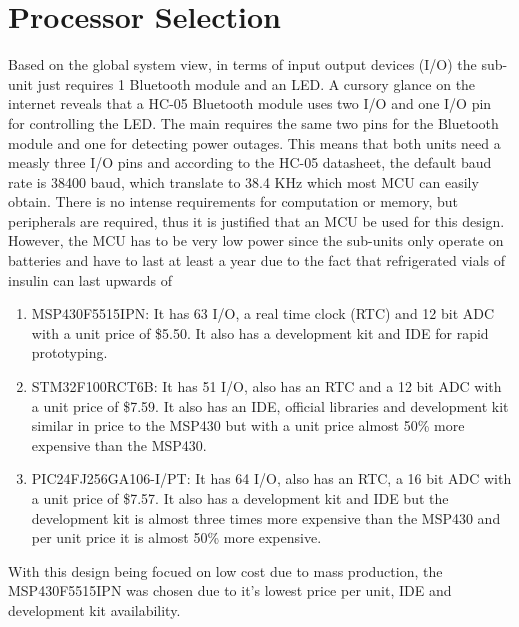 \section{Processor Selection}
Based on the global system view, in terms of input output devices (I/O) the sub-unit just requires 1 Bluetooth module and an LED. A cursory glance on the internet reveals that a HC-05 Bluetooth module\cite{InterfacingHC05Bluetooth} uses two I/O and one I/O pin for controlling the LED. The main requires the same two pins for the Bluetooth module and one for detecting power outages. This means that both units need a measly three I/O pins and according to the HC-05 datasheet, the default baud rate is 38400 baud, which translate to 38.4 KHz which most MCU can easily obtain. There is no intense requirements for computation or memory, but peripherals are required, thus it is justified that an MCU be used for this design. However, the MCU has to be very low power since the sub-units only operate on batteries and have to last at least a year due to the fact that refrigerated vials of insulin can last upwards of
\begin{enumerate}
  \item MSP430F5515IPN: It has 63 I/O, a real time clock (RTC) and 12 bit ADC with a unit price of \$5.50. It also has a development kit and IDE for rapid prototyping.
  \item STM32F100RCT6B: It has 51 I/O, also has an RTC and a 12 bit ADC with a unit price of \$7.59. It also has an IDE, official libraries and development kit similar in price to the MSP430 but with a unit price almost 50\% more expensive than the MSP430.
  \item PIC24FJ256GA106-I/PT: It has 64 I/O, also has an RTC, a 16 bit ADC with a unit price of \$7.57. It also has a development kit and IDE but the development kit is almost three times more expensive than the MSP430 and per unit price it is almost 50\% more expensive.
\end{enumerate}
With this design being focued on low cost due to mass production, the MSP430F5515IPN was chosen due to it's lowest price per unit, IDE and development kit availability.
